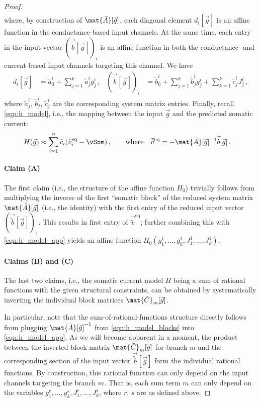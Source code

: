 \begin{proof}
\begin{align*}
\end{align*}
where, by construction of $\mat{\tilde A}[\vec g]$, each diagonal element $d_i[\vec g]$ is an affine function in the conductance-based input channels.
At the same time, each entry in the input vector $(\vec{\tilde b}[\vec g])_i$ is an affine function in both the conductance- and current-based input channels targeting this channel.
We have
\begin{align*}
	d_i[\vec g] &= \tilde a_0^i + \sum_{j = 1}^{k} \tilde a_j^i g_j^i \,, & 
	(\vec{\tilde b}[\vec g])_i &= \tilde b_0^i + \sum_{j = 1}^{k} \tilde b_j^i g_j^i + \sum_{k = 1}^{k} \tilde c_j^i J_j^i \,,
\end{align*}
where $\tilde a^i_j$, $\tilde b^i_j$, $\tilde c^i_j$ are the corresponding system matrix entries.
Finally, recall \cref{eqn:h_model}, i.e., the mapping between the input $\vec g$ and the predicted somatic current:
\begin{align}
	H(\vec g) &\approx \sum_{i = 1}^n \tilde c_i (\tilde v^\mathrm{eq}_i - \vSom) \,,
	\quad\quad \text{where} \quad \vec{\tilde v}^\mathrm{eq} = -{\mat{\tilde A}}[\vec g]^{-1} \vec{\tilde b}[\vec g] \,.
	\label{eqn:h_model_app}
\end{align}

\paragraph{Claim (A)}
The first claim (i.e., the structure of the affine function $H_0$) trivially follows from multiplying the inverse of the first \enquote{somatic block} of the reduced system matrix $\mat{\tilde A}[\vec g]$ (i.e., the identity) with the first entry of the reduced input vector $(\vec{\tilde b}[\vec g])_1$.
This results in first entry of $\vec{\tilde v}^\mathrm{eq}$; further combining this with \cref{eqn:h_model_app} yields an affine function $H_0(g_1^1, \ldots, g_k^1, J_1^1, \ldots, J_k^1)$.

\paragraph{Claims (B) and (C)}
The last two claims, i.e., the somatic current model $H$ being a sum of rational functions with the given structural constraints, can be obtained by systematically inverting the individual block matrices $\mat{\tilde C}_m[\vec g]$.

In particular, note that the sum-of-rational-functions structure directly follows from plugging $\mat{\tilde A}[\vec g]^{-1}$ from \cref{eqn:h_model_blocks} into \cref{eqn:h_model_app}.
As we will become apparent in a moment, the product between the inverted block matrix $\mat{\tilde C}_m[\vec g]$ for branch $m$ and the corresponding section of the input vector $\vec{\tilde b}[\vec g]$ form the individual rational functions.
By construction, this rational function can only depend on the input channels targeting the branch $m$.
That is, each sum term $m$ can only depend on the variables $g_1^{r}, \ldots, g_k^{s}, J_1^{r}, \ldots, J_k^{s}$, where $r$, $s$ are as defined above.


\end{proof}
